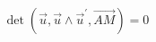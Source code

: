 \begin{displaymath}
 \det (\overrightarrow{u},\overrightarrow{u}\wedge\overrightarrow{u}^\prime,\overrightarrow{AM})=0
\end{displaymath}
